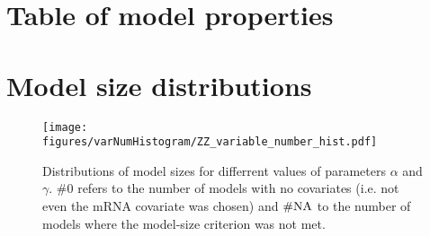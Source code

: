 \documentclass[english,12pt,a4paper,pdftex,elec,utf8]{aaltothesis}
\begin{document}

\clearpage

{}














\clearpage
\thesisappendix

\clearpage
\section{Table of model properties\label{app:full-model-table}}


\clearpage
\section{Model size distributions\label{app:model-sizes}}

\begin{figure}[htb]
  \centering
  \texttt{[image: figures/varNumHistogram/ZZ\_variable\_number\_hist.pdf]}
  \caption{Distributions of model sizes for differrent values of parameters $\alpha$ and $\gamma$.
  $\# 0$ refers to the number of models with no covariates (i.e. not even the mRNA covariate was chosen)
  and $\# \textup{NA}$ to the number of models where the model-size criterion was not met.}
  \label{fig:model-size-distribution}
\end{figure}



\end{document}
